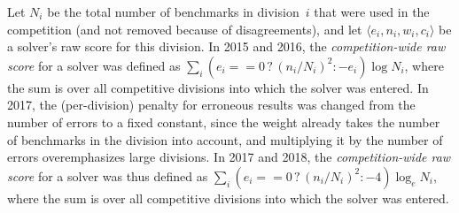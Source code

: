 \documentclass[dvipsnames,table,twoside,11pt]{article}
\begin{document}
Let $N_i$ be the total number of benchmarks in division~$i$ that were used in the
competition (and not removed because of disagreements), and let $\langle e_i, n_i, w_i, c_i\rangle$ be a solver's
raw score for this division.
%
In 2015 and 2016,
the \emph{competition-wide raw score} for a solver was defined as
%
$\sum_i (e_i == 0 \,?\, (n_i/N_i)^2 : -e_i) \log N_i$,
%
where the sum is over all competitive
divisions into which the solver was
entered.
%
In 2017, the (per-division) penalty for erroneous results was changed from the
number of errors to a fixed constant, since the weight already takes the number
of benchmarks in the division into account, and multiplying it by the number of
errors overemphasizes large divisions.
In 2017 and 2018,
the \emph{competition-wide raw score} for a solver was thus defined as
%
$\sum_i (e_i == 0 \,?\, (n_i/N_i)^2 : -4) \log_e N_i$,
%
where the sum is over all competitive divisions into which the solver
was entered.
\end{document}
